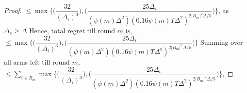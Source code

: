 \begin{proof}
\newline
$\leq \max{\bigg\lbrace \bigg(\dfrac{32}{(\Delta_{i})^{3}}\bigg) ,\bigg(\dfrac{25\Delta_{i}}{(\psi(m)\Delta^{2})(0.16\psi(m)T\Delta^{2})^{2|B_{m}|^{2}\Delta/5}}\bigg)\bigg\rbrace}$, as $\Delta_{s}\geq \Delta$
Hence, total regret till round $m$ is,
\newline
$\leq \max{\bigg\lbrace \bigg(\dfrac{32}{(\Delta_{i})^{3}}\bigg) ,\bigg(\dfrac{25\Delta_{i}}{(\psi(m)\Delta^{2})(0.16\psi(m)T\Delta^{2})^{2|B_{m}|^{2}\Delta/5}}\bigg)\bigg\rbrace}$
\newline
Summing over all arms left till round $m$,
\newline
$\leq \sum_{i\in B_{m}}\max{\bigg\lbrace \bigg(\dfrac{32}{(\Delta_{i})^{3}}\bigg),\bigg(\dfrac{25\Delta_{i}}{(\psi(m)\Delta^{2})(0.16\psi(m)T\Delta^{2})^{2|B_{m}|^{2}\Delta/5}}\bigg)\bigg\rbrace}$, 

\end{proof}

